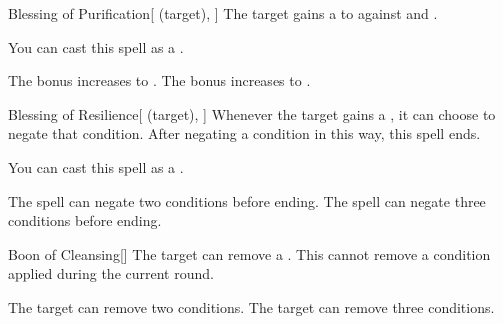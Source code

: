 \lowercase{\hypertarget{spell:Blessing of Purification}{}}\label{spell:Blessing of Purification}
\begin{attuneability}[Rank 3]{\hypertarget{spell:Blessing of Purification}{Blessing of Purification}}[ (target), ]
The target gains a   to  against  and .

You can cast this spell as a .

\rankline
{} The bonus increases to .
 The bonus increases to .
\end{attuneability}
\vspace{0.25em}



\lowercase{\hypertarget{spell:Blessing of Resilience}{}}\label{spell:Blessing of Resilience}
\begin{attuneability}[Rank 3]{\hypertarget{spell:Blessing of Resilience}{Blessing of Resilience}}[ (target), ]
Whenever the target gains a , it can choose to negate that condition.
After negating a condition in this way, this spell ends.

You can cast this spell as a .

\rankline
{} The spell can negate two conditions before ending.
 The spell can negate three conditions before ending.
\end{attuneability}
\vspace{0.25em}



\lowercase{\hypertarget{spell:Boon of Cleansing}{}}\label{spell:Boon of Cleansing}
\begin{freeability}[Rank 3]{\hypertarget{spell:Boon of Cleansing}{Boon of Cleansing}}[]
The target can remove a .
This cannot remove a condition applied during the current round.

\rankline
{} The target can remove two conditions.
 The target can remove three conditions.
\end{freeability}
\vspace{0.25em}



